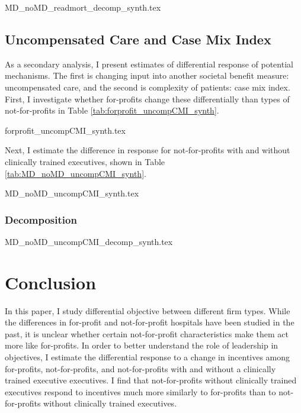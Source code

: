 \documentclass[12pt]{article}
\begin{document}
    {MD_noMD_readmort_decomp_synth.tex}

     


    \subsection{Uncompensated Care and Case Mix Index}

    As a secondary analysis, I present estimates of differential response of potential mechanisms. The first is changing input into another societal benefit measure: uncompensated care, and the second is complexity of patients: case mix index. First, I investigate whether for-profits change these differentially than types of not-for-profits in Table \ref{tab:forprofit_uncompCMI_synth}. 

    {forprofit_uncompCMI_synth.tex}

    Next, I estimate the difference in response for not-for-profits with and without clinically trained executives, shown in Table \ref{tab:MD_noMD_uncompCMI_synth}. 

    {MD_noMD_uncompCMI_synth.tex}

    \subsubsection{Decomposition}

    {MD_noMD_uncompCMI_decomp_synth.tex}
    

    \section{Conclusion}

    In this paper, I study differential objective between different firm types. While the differences in for-profit and not-for-profit hospitals have been studied in the past, it is unclear whether certain not-for-profit characteristics make them act more like for-profits. In order to better understand the role of leadership in objectives, I estimate the differential response to a change in incentives among for-profits, not-for-profits, and not-for-profits with and without a clinically trained executive executives. I find that not-for-profits without clinically trained executives respond to incentives much more similarly to for-profits than to not-for-profits without clinically trained executives.

	
	\newpage

    \printbibliography
\end{document}
